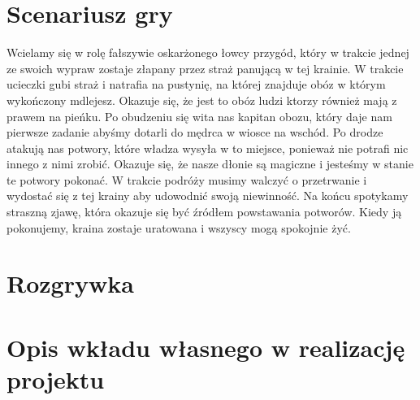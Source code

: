 \documentclass[10pt,a4paper]{article}
\begin{document}
\section{Scenariusz gry}
Wcielamy się w rolę fałszywie oskarżonego łowcy przygód, który w trakcie jednej ze swoich wypraw zostaje złapany przez straż panującą w tej krainie. W trakcie ucieczki gubi straż i natrafia na pustynię, na której znajduje obóz w którym wykończony mdlejesz. Okazuje się, że jest to obóz ludzi ktorzy również mają z prawem na pieńku. Po obudzeniu się wita nas kapitan obozu, który daje nam pierwsze zadanie abyśmy dotarli do mędrca w wiosce na wschód. Po drodze atakują nas potwory, które władza wysyła w to miejsce, ponieważ nie potrafi nic innego z nimi zrobić. Okazuje się, że nasze dłonie są magiczne i jesteśmy w stanie te potwory pokonać. W trakcie podróży musimy walczyć o przetrwanie i wydostać się z tej krainy aby udowodnić swoją niewinność. Na końcu spotykamy straszną zjawę, która okazuje się być źródłem powstawania potworów. Kiedy ją pokonujemy, kraina zostaje uratowana i wszyscy mogą spokojnie żyć.

\clearpage
\section{Rozgrywka}

\clearpage
\section{Opis wkładu własnego w realizację projektu}
\end{document}
